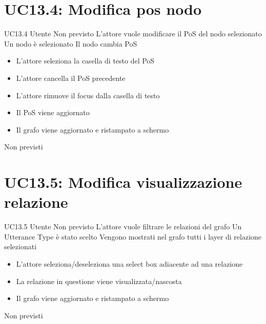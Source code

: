 \documentclass[../AnalisideiRequisiti.tex]{subfiles}
\begin{document}
\section{UC13.4: Modifica pos nodo}
\UserCase
{UC13.4}
{Utente}
{Non previsto}
{L'attore vuole modificare il PoS del nodo selezionato}
{Un nodo è selezionato }
{Il nodo cambia PoS}
{
	\begin{itemize}
		\item{} L'attore seleziona la casella di testo del PoS
		\item{} L'attore cancella il PoS precedente
		\item{} L'attore rimuove il focus dalla casella di testo
		\item{} Il PoS viene aggiornato
		\item{} Il grafo viene aggiornato e ristampato a schermo 
	\end{itemize}
}
{Non previsti}

\section{UC13.5: Modifica visualizzazione relazione}
\UserCase
{UC13.5}
{Utente}
{Non previsto}
{L'attore vuole filtrare le relazioni del grafo}
{Un Utterance Type è stato scelto }
{Vengono mostrati nel grafo tutti i layer di relazione selezionati}
{
	\begin{itemize}
		\item{} L'attore seleziona/deseleziona una select box adiacente ad una relazione
		\item{} La relazione in questione viene visualizzata/nascosta
		\item{} Il grafo viene aggiornato e ristampato a schermo 
	\end{itemize}
}
{Non previsti}
\end{document}
